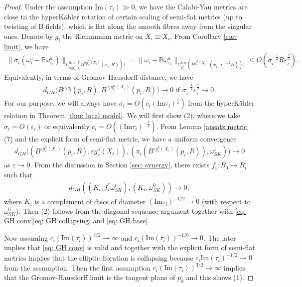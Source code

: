 \documentclass[11pt]{amsart}
\theoremstyle{plain}
\theoremstyle{definition}
\numberwithin{equation}{section}
\renewcommand{\leq}{\leqslant}
\renewcommand{\epsilon}{\varepsilon}
\begin{document}
\begin{proof}
	Under the assumption $\mbox{Im}(\tau_i)\gg 0$, we have the Calabi-Yau metrics are close to the hyperK\"ahler rotation of certain scaling of semi-flat metrics (up to twisting of B-fields), which is flat along the smooth fibres away from the singular ones. Denote by $g_i$ the Riemannian metric on $\check{X}_i\cong X_i$.
	From Corollary \ref{cor: limit}, we have 
	 \begin{align*}
	 	\| \sigma_i (\omega_i-\mathbb{B}\omega^a_{\epsilon_i})\|_{C^{0,\alpha}_{\sigma_i g^a_{\epsilon_i}}(B^{\sigma g^a_{\epsilon_i}(X_i)}(x_i,R)))}= 	\|  \omega_i-\mathbb{B}\omega^a_{\epsilon_i}\|_{C^{0,\alpha}_{ g^a_{\epsilon_i}}(B^{ g^a_{\epsilon_i}(X_i)}(x_i,\sigma_i^{-1/2} R)))}\leq O(\sigma_i^{-\frac{1}{2}}R\epsilon_i^{\frac{2}{3}}). 
	 \end{align*} Equivalently, in terms of Gromov-Hausdorff distance, we have 
	 \begin{align}\label{eq: GH conv}
	 	 d_{GH}\bigg(  B^{\sigma_i g_i}(p_i,R), B^{ \sigma_i g^a_{\epsilon_i}(X_i)}(p_i,R) \bigg)\rightarrow 0 \mbox{ if } \sigma_i^{-\frac{1}{2}}\epsilon_i^{\frac{2}{3}}\rightarrow 0.
	 \end{align}
	For our purpose, we will always have  $\sigma_i=O(c_i(\mbox{Im}\tau_i)^{\frac{1}{2}})$ from the hyperK\"ahler relation in Theorem \ref{thm: local model}.
  We will first show (2), where we take $\sigma_i=O(\epsilon_i)$ or equivalently $c_i=O((\mbox{Im}\tau_i)^{-\frac{3}{2}})$. 
From Lemma \ref{ansatz metric} (7) and the explicit form of semi-flat metric, we have a uniform convergence
     \begin{align} \label{eq: GH collapsing}
     	d_{GH}\bigg((B^{\epsilon g^a_{\epsilon}(X_i)}(p_i,R), \epsilon g^a_{\epsilon}(X_i)), (\pi_i(B^{ \epsilon g^a_{\epsilon}(X_i)}(p_i,R)),\omega^i_{SK})\bigg)\rightarrow 0
    \end{align}	as $\epsilon \rightarrow 0$. 
    From the discussion in Section \ref{sec: synergy}, there exists $f_i:B_0\rightarrow B_i$ such that 
    \begin{align}\label{eq: GH base}
    	  d_{GH}((K_i,f_i^*\omega^i_{SK}), (K_i, \omega^0_{SK}))\rightarrow 0,
    \end{align} where $K_i$ is a complement of discs of diameter $(\mbox{Im}\tau_i)^{-1/2}\rightarrow 0$ (with respect to $\omega^0_{SK}$). 
    Then (2) follows from the diagonal sequence argument together with \eqref{eq: GH conv}\eqref{eq: GH collapsing} and \eqref{eq: GH base}. 
    
  
    
    Now assuming $c_i(\mbox{Im}(\tau_i))^{3/2}\rightarrow \infty$ and $c_i (\mbox{Im}(\tau_i))^{-1/6}\rightarrow 0$. The later implies that \eqref{eq: GH conv} is valid and together with the explicit form of semi-flat metrics implies that the elliptic fibration is collapsing because $c_i\mbox{Im}(\tau_i)^{-1/2}\rightarrow 0$ from the assumption. Then the first assumption $c_i(\mbox{Im}(\tau_i))^{3/2}\rightarrow \infty$ implies that the Gromov-Hausdorff limit is the tangent plane of $p_0$ and this shows (1). 
    

\end{proof}
\end{document}
